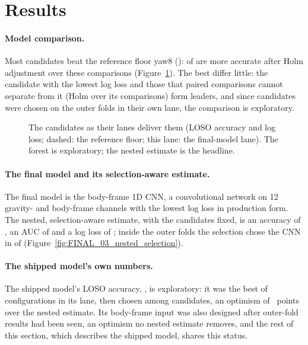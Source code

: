 \section{Results}\label{sec:results}

\paragraph{Model comparison.} Most candidates beat the reference floor yaw8 ():
 of  are more accurate after Holm adjustment over these comparisons
(Figure~\ref{fig:FINAL_01_master_forest}). The best differ little: the candidate with the lowest log loss and those
that paired comparisons cannot separate from it (Holm over its  comparisons) form
 leaders, and since  candidates were chosen on the outer
folds in their own lane, the comparison is exploratory.

\begin{figure}[htbp]
\centering
{}
\caption{The  candidates as their lanes deliver them (LOSO accuracy and log loss; dashed: the
reference floor; this lane: the final-model lane). The forest is exploratory; the nested estimate is the headline.}
\label{fig:FINAL_01_master_forest}
\end{figure}

\paragraph{The final model and its selection-aware estimate.} The final model is the body-frame 1D CNN, a
convolutional network on 12 gravity- and body-frame channels with the lowest log loss in production form. The
nested, selection-aware estimate, with the candidates fixed, is an accuracy of , an AUC of
 and a log loss of ; inside the outer folds the selection chose the
CNN in  of  (Figure~\ref{fig:FINAL_03_nested_selection}).

\paragraph{The shipped model's own numbers.} The shipped model's LOSO accuracy, , is
exploratory: it was the best of  configurations in its lane, then chosen among
 candidates, an optimism of ~points over the nested estimate. Its
body-frame input was also designed after outer-fold results had been seen, an optimism no nested estimate removes,
and the rest of this section, which describes the shipped model, shares this status.

